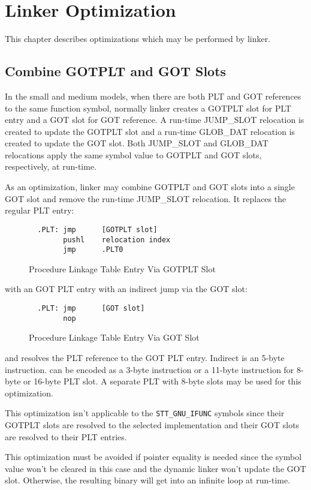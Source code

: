 \chapter{Linker Optimization}

This chapter describes optimizations which may be performed by linker.

\section{Combine GOTPLT and GOT Slots}
In the small and medium models, when there are both PLT and GOT references
to the same function symbol, normally linker creates a GOTPLT slot for PLT
entry and a GOT slot for GOT reference.  A run-time JUMP_SLOT relocation is
created to update the GOTPLT slot and a run-time GLOB_DAT relocation is
created to update the GOT slot.  Both JUMP_SLOT and GLOB_DAT relocations
apply the same symbol value to GOTPLT and GOT slots, respectively, at
run-time.

As an optimization, linker may combine GOTPLT and GOT slots into a single
GOT slot and remove the run-time JUMP_SLOT relocation.  It replaces the
regular PLT entry:

\begin{figure}[H]
\Hrule
\caption{Procedure Linkage Table Entry Via GOTPLT Slot}
\label{gotplt_plt}
\begin{footnotesize}
\begin{verbatim}
  .PLT: jmp      [GOTPLT slot]
        pushl    relocation index
        jmp      .PLT0
\end{verbatim}
\end{footnotesize}
\Hrule
\end{figure}

\noindent
with an GOT PLT entry with an indirect jump via the GOT slot:
\indent

\begin{figure}[H]
\Hrule
\caption{Procedure Linkage Table Entry Via GOT Slot}
\label{got_plt}
\begin{footnotesize}
\begin{verbatim}
  .PLT: jmp      [GOT slot]
        nop
\end{verbatim}
\end{footnotesize}
\Hrule
\end{figure}

\noindent
and resolves the PLT reference to the GOT PLT entry.  Indirect 
is an 5-byte instruction.   can be encoded as a 3-byte
instruction or a 11-byte instruction for 8-byte or 16-byte PLT slot.
A separate PLT with 8-byte slots may be used for this optimization.
\indent

This optimization isn't applicable to the \texttt{STT_GNU_IFUNC} symbols
since their GOTPLT slots are resolved to the selected implementation and
their GOT slots are resolved to their PLT entries.

This optimization must be avoided if pointer equality is needed since
the symbol value won't be cleared in this case and the dynamic linker
won't update the GOT slot.  Otherwise, the resulting binary will get
into an infinite loop at run-time.

